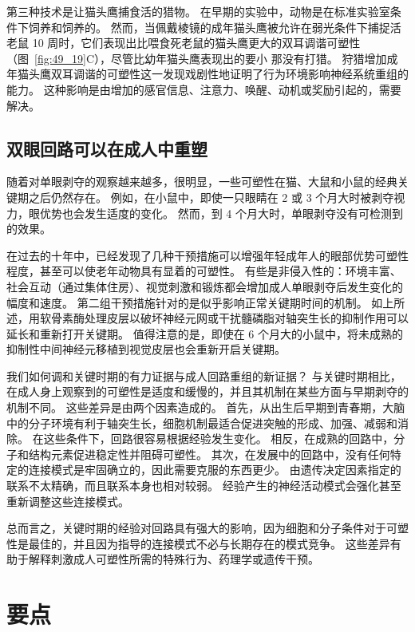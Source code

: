 第三种技术是让猫头鹰捕食活的猎物。
在早期的实验中，动物是在标准实验室条件下饲养和饲养的。
然而，当佩戴棱镜的成年猫头鹰被允许在弱光条件下捕捉活老鼠 10 周时，它们表现出比喂食死老鼠的猫头鹰更大的双耳调谐可塑性（图~\ref{fig:49_19}C），尽管比幼年猫头鹰表现出的要小 那没有打猎。
狩猎增加成年猫头鹰双耳调谐的可塑性这一发现戏剧性地证明了行为环境影响神经系统重组的能力。
这种影响是由增加的感官信息、注意力、唤醒、动机或奖励引起的，需要解决。



\subsection{双眼回路可以在成人中重塑}

随着对单眼剥夺的观察越来越多，很明显，一些可塑性在猫、大鼠和小鼠的经典关键期之后仍然存在。
例如，在小鼠中，即使一只眼睛在 2 或 3 个月大时被剥夺视力，眼优势也会发生适度的变化。
然而，到 4 个月大时，单眼剥夺没有可检测到的效果。


在过去的十年中，已经发现了几种干预措施可以增强年轻成年人的眼部优势可塑性程度，甚至可以使老年动物具有显着的可塑性。
有些是非侵入性的：环境丰富、社会互动（通过集体住房）、视觉刺激和锻炼都会增加成人单眼剥夺后发生变化的幅度和速度。
第二组干预措施针对的是似乎影响正常关键期时间的机制。
如上所述，用软骨素酶处理皮层以破坏神经元网或干扰髓磷脂对轴突生长的抑制作用可以延长和重新打开关键期。
值得注意的是，即使在 6 个月大的小鼠中，将未成熟的抑制性中间神经元移植到视觉皮层也会重新开启关键期。


我们如何调和关键时期的有力证据与成人回路重组的新证据？
与关键时期相比，在成人身上观察到的可塑性是适度和缓慢的，并且其机制在某些方面与早期剥夺的机制不同。
这些差异是由两个因素造成的。
首先，从出生后早期到青春期，大脑中的分子环境有利于轴突生长，细胞机制最适合促进突触的形成、加强、减弱和消除。
在这些条件下，回路很容易根据经验发生变化。
相反，在成熟的回路中，分子和结构元素促进稳定性并阻碍可塑性。
其次，在发展中的回路中，没有任何特定的连接模式是牢固确立的，因此需要克服的东西更少。
由遗传决定因素指定的联系不太精确，而且联系本身也相对较弱。
经验产生的神经活动模式会强化甚至重新调整这些连接模式。


总而言之，关键时期的经验对回路具有强大的影响，因为细胞和分子条件对于可塑性是最佳的，并且因为指导的连接模式不必与长期存在的模式竞争。
这些差异有助于解释刺激成人可塑性所需的特殊行为、药理学或遗传干预。



\section{要点}

